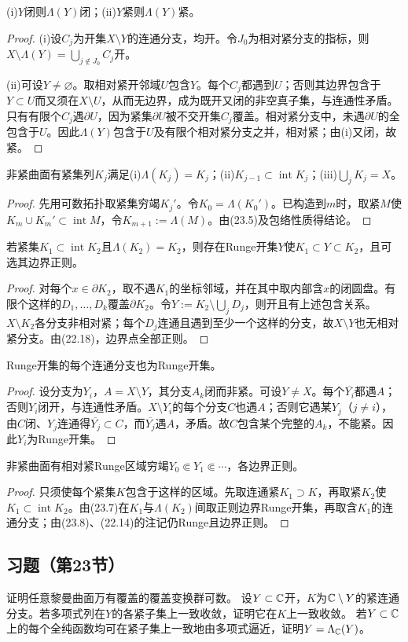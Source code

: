 (i)$Y$闭则$\Lambda(Y)$闭；(ii)$Y$紧则$\Lambda(Y)$紧。
\begin{proof}
(i)设$C_j$为开集$X\setminus Y$的连通分支，均开。令$J_0$为相对紧分支的指标，则$X\setminus\Lambda(Y)=\bigcup_{j\notin J_0}C_j$开。

(ii)可设$Y\ne\varnothing$。取相对紧开邻域$U$包含$Y$。每个$C_j$都遇到$U$；否则其边界包含于$Y\subset U$而又须在$X\setminus U$，从而无边界，成为既开又闭的非空真子集，与连通性矛盾。
只有有限个$C_j$遇$\partial U$，因为紧集$\partial U$被不交开集$C_j$覆盖。相对紧分支中，未遇$\partial U$的全包含于$U$。因此$\Lambda(Y)$包含于$U$及有限个相对紧分支之并，相对紧；由(i)又闭，故紧。
\end{proof}
非紧曲面有紧集列$K_j$满足(i)$\Lambda(K_j)=K_j$；(ii)$K_{j-1}\subset\operatorname{int}K_j$；(iii)$\bigcup_jK_j=X$。
\begin{proof}
先用可数拓扑取紧集穷竭$K_j'$。令$K_0=\Lambda(K_0')$。已构造到$m$时，取紧$M$使$K_m\cup K_m'\subset\operatorname{int}M$，令$K_{m+1}:=\Lambda(M)$。由(23.5)及包络性质得结论。
\end{proof}
若紧集$K_1\subset\operatorname{int}K_2$且$\Lambda(K_2)=K_2$，则存在Runge开集$Y$使$K_1\subset Y\subset K_2$，且可选其边界正则。
\begin{proof}
对每个$x\in\partial K_2$，取不遇$K_1$的坐标邻域，并在其中取内部含$x$的闭圆盘。有限个这样的$D_1,\ldots,D_k$覆盖$\partial K_2$。令$Y:=K_2\setminus\bigcup_jD_j$，则开且有上述包含关系。$X\setminus K_2$各分支非相对紧；每个$D_j$连通且遇到至少一个这样的分支，故$X\setminus Y$也无相对紧分支。由(22.18)，边界点全部正则。
\end{proof}
Runge开集的每个连通分支也为Runge开集。
\begin{proof}
设分支为$Y_i$，$A=X\setminus Y$，其分支$A_k$闭而非紧。可设$Y\ne X$。每个$\overline{Y_i}$都遇$A$；否则$Y_i$闭开，与连通性矛盾。$X\setminus Y_i$的每个分支$C$也遇$A$；否则它遇某$Y_j$（$j\ne i$），由$C$闭、$Y_j$连通得$\overline{Y_j}\subset C$，而$\overline{Y_j}$遇$A$，矛盾。故$C$包含某个完整的$A_k$，不能紧。因此$Y_i$为Runge开集。
\end{proof}
非紧曲面有相对紧Runge区域穷竭$Y_0\Subset Y_1\Subset\cdots$，各边界正则。
\begin{proof}
只须使每个紧集$K$包含于这样的区域。先取连通紧$K_1\supset K$，再取紧$K_2$使$K_1\subset\operatorname{int}K_2$。由(23.7)在$K_1$与$\Lambda(K_2)$间取正则边界Runge开集，再取含$K_1$的连通分支；由(23.8)、(22.14)的注记仍Runge且边界正则。
\end{proof}
\subsection*{习题（第23节）}
证明任意黎曼曲面万有覆盖的覆盖变换群可数。
设$Y\subset\mathbb C$开，$K$为$\mathbb C\setminus Y$的紧连通分支。若多项式列在$Y$的各紧子集上一致收敛，证明它在$K$上一致收敛。
若$Y\subset\mathbb C$上的每个全纯函数均可在紧子集上一致地由多项式逼近，证明$Y=\Lambda_\mathbb C(Y)$。
